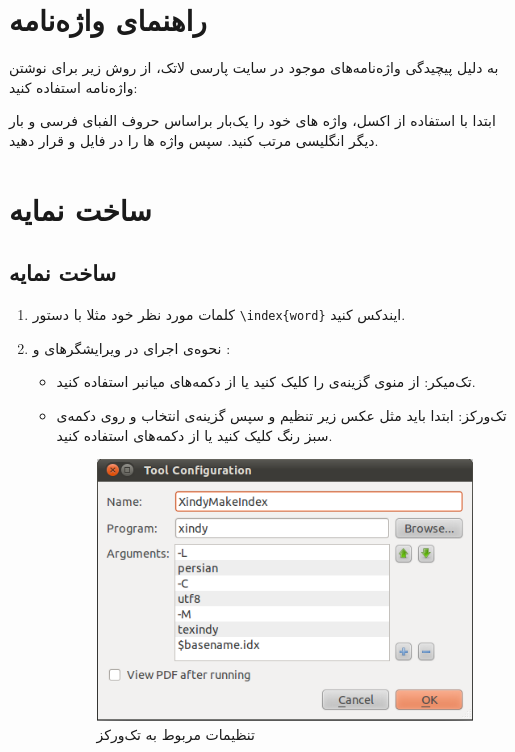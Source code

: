 \section{راهنمای واژه‌نامه}

به دلیل پیچیدگی واژه‌نامه‌های موجود در سایت پارسی لاتک، از روش زیر برای نوشتن واژه‌نامه استفاده کنید:

ابتدا با استفاده از اکسل، واژه های خود را یک‌بار براساس حروف الفبای فرسی و بار دیگر انگلیسی مرتب کنید. سپس واژه ها را در فایل  و  قرار دهید.

\section{ساخت نمایه}\label{Namaye}
\subsection{ساخت نمایه}
 \begin{enumerate}

\item
کلمات مورد نظر خود مثلا  با دستور \verb|\index{word}| ایندکس کنید.
\item
نحوه‌ی اجرای    در ویرایشگرهای  و :
\begin{itemize}
\item  تک‌میکر: از منوی  گزینه‌ی  را کلیک کنید یا از دکمه‌‌های میانبر  استفاده کنید.

\item  تک‌ورکز: ابتدا باید مثل عکس زیر تنظیم  و سپس گزینه‌ی   انتخاب و روی دکمه‌ی سبز رنگ کلیک کنید یا از دکمه‌های   استفاده کنید.

\begin{figure}[!h]
\centerline{\includegraphics[width=.5\textwidth]{Xindy_Make_Index.png}}
\caption{تنظیمات مربوط به تک‌ورکز}
\end{figure}

\end{itemize}
 \end{enumerate}
 
